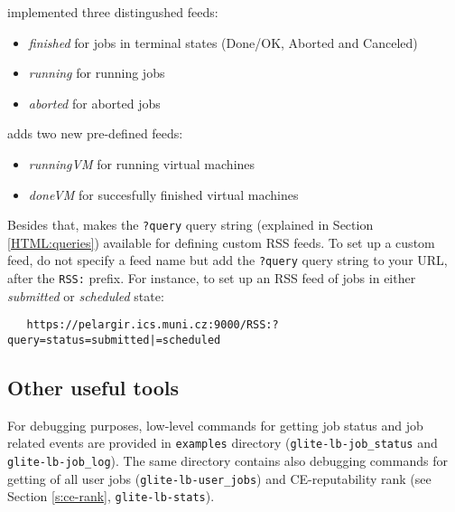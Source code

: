  implemented three distingushed feeds:
\begin{itemize}
 \item \textit{finished} for jobs in terminal states (Done/OK, Aborted and Canceled)
 \item \textit{running} for running jobs
 \item \textit{aborted} for aborted jobs
\end{itemize}

 adds two new pre-defined feeds:
\begin{itemize}
 \item \textit{runningVM} for running virtual machines
 \item \textit{doneVM} for succesfully finished virtual machines
\end{itemize}

Besides that,  makes the \texttt{?query} query string (explained in Section \ref{HTML:queries}) available for defining custom RSS feeds. To set up a custom feed, do not specify a feed name but add the \texttt{?query} query string to your URL, after the \texttt{RSS:} prefix. For instance, to set up an RSS feed of jobs in either \emph{submitted} or \emph{scheduled} state:
\begin{verbatim}
   https://pelargir.ics.muni.cz:9000/RSS:?query=status=submitted|=scheduled
\end{verbatim}  

\subsection{Other useful tools}

For debugging purposes, low-level commands for getting \LB job status and job related events are provided in 
\verb'examples' directory (\verb'glite-lb-job_status' and \verb'glite-lb-job_log'). The same directory
contains also debugging commands for getting of all user jobs (\verb'glite-lb-user_jobs') and
CE-reputability rank (see Section \ref{s:ce-rank}, \verb'glite-lb-stats').

